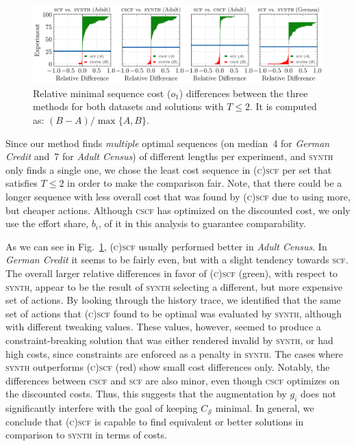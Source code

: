 \documentclass[runningheads, envcountsame, a4paper]{llncs}
\newcommand{\ours}{\textsc{cscf}}
\newcommand{\oursShort}{\ours}
\newcommand{\oursBoth}{\textsc{(c)scf}}
\newcommand{\mainEA}{\oursShort}
\newcommand{\competitor}{\textsc{synth}}
\newcommand{\alternativeEA}{\textsc{scf}}
\newcommand{\adultDataset}{\emph{Adult Census}}
\newcommand{\germanDataset}{\emph{German Credit}}
\newcommand{\sequence}{\mathcal{S}}
\newcommand{\objective}{o}
\newcommand{\seqCosts}{\objective_{1}}
\newcommand{\consequentialCosts}{g}
\newcommand{\baseCosts}{b}
\newcommand{\totalCosts}{C}
\begin{document}
\begin{figure}[!ht]
    \centering
    \includegraphics[width=\textwidth]{figures/cost_diff.pdf}
    \caption{Relative minimal sequence cost ($\seqCosts$) differences between the three methods for both datasets and solutions with $T \leq 2$. It is computed as: $(B-A)/\max{\{A,B\}}$.}
    \label{fig:cost_comparison}
\end{figure}

Since our method finds \emph{multiple} optimal sequences (on median~4 for \germanDataset{} and~7 for \adultDataset{}) of different lengths per experiment, and \competitor{} only finds a single one, we chose the least cost sequence in \oursBoth{} per set that satisfies $T \leq 2$ in order to make the comparison fair. Note, that there could be a longer sequence with less overall cost that was found by \oursBoth{} due to using more, but cheaper actions.
Although \mainEA{} has optimized on the discounted cost, we only use the effort share, $\baseCosts_i$, of it in this analysis to guarantee comparability.

As we can see in Fig.~\ref{fig:cost_comparison}, \oursBoth{} usually performed better in \adultDataset{}. In \germanDataset{} it seems to be fairly even, but with a slight tendency towards \alternativeEA{}. 
The overall larger relative differences in favor of \oursBoth{} (green), with respect to \competitor{}, appear to be the result of \competitor{} selecting a different, but more expensive set of actions. By looking through the history trace, we identified that the same set of actions that \oursBoth{} found to be optimal was evaluated by \competitor{}, although with different tweaking values. These values, however, seemed to produce a constraint-breaking solution that was either rendered invalid by \competitor{}, or had high costs, since constraints are enforced as a penalty in \competitor{}.
The cases where \competitor{} outperforms \oursBoth{} (red) show small cost differences only. Notably, the differences between \mainEA{} and \alternativeEA{} are also minor, even though \mainEA{} optimizes on the discounted costs.
Thus, this suggests that the augmentation by $\consequentialCosts_i$ does not significantly interfere with the goal of keeping $\totalCosts_\sequence$ minimal.
In general, we conclude that \oursBoth{} is capable to find equivalent or better solutions in comparison to \competitor{} in terms of costs.
\end{document}
